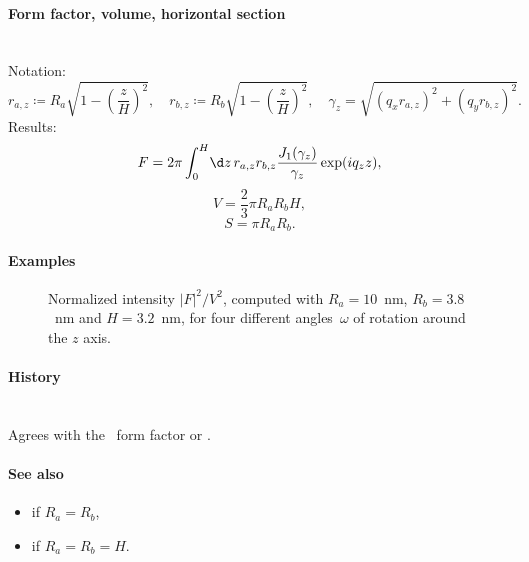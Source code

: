 \paragraph{Form factor, volume, horizontal section}\strut\\
Notation:
\begin{equation*}
 r_{a,z} \coloneqq R_a \sqrt{1-\left(\dfrac{z}{H} \right)^2},\quad
 r_{b,z} \coloneqq R_b \sqrt{1-\left(\dfrac{z}{H} \right)^2}, \quad
 \gamma_z =\sqrt{(q_x r_{a,z})^2+(q_y r_{b,z})^2}.
\end{equation*}
Results:
\begin{equation*}
  F = 2\pi \int_0^{H} \!\d z\, r_{a,z} r_{b,z}
                               \frac{J_1(\gamma_z)}{\gamma_z}\exp(iq_z z),
\end{equation*}
\begin{equation*}
  V = \dfrac{2}{3}\pi R_a R_bH,
\end{equation*}
\begin{equation*}
  S =\pi R_a R_b.
\end{equation*}

\paragraph{Examples}\strut

\begin{figure}[H]
\begin{center}
\end{center}
\caption{Normalized intensity $|F|^2/V^2$,
computed with $R_a=10$~nm, $R_b=3.8$~nm and $H=3.2$~nm,
for four different angles~$\omega$ of rotation around the $z$ axis.}
\end{figure}

\paragraph{History}\strut\\
Agrees with the \IsGISAXS\ form factor
\cite[Eq.~2.42, with wrong sign in the $z$-dependent phase factor]{Laz06}
or  \cite[Eq.~229]{ReLL09}.

\paragraph{See also}
\begin{itemize}
\item {} if $R_a=R_b$,
\item {} if $R_a=R_b=H$.
\end{itemize}



